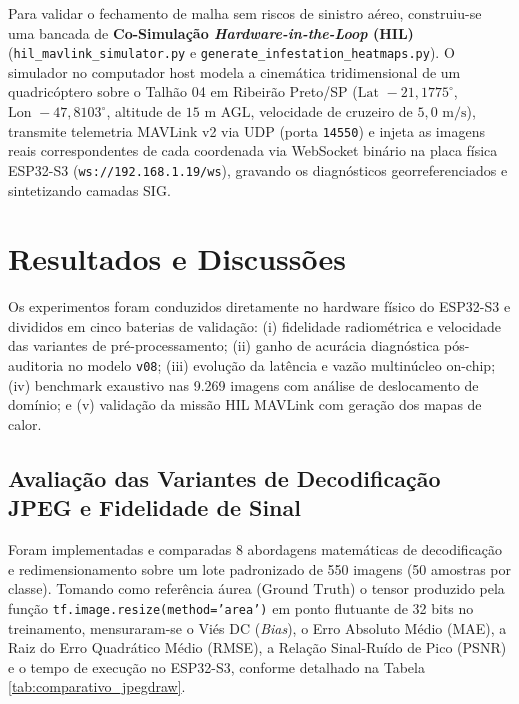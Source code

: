 \documentclass[12pt]{article}
\begin{document}
Para validar o fechamento de malha sem riscos de sinistro aéreo, construiu-se uma bancada de \textbf{Co-Simulação \textit{Hardware-in-the-Loop} (HIL)} (\texttt{hil\_mavlink\_simulator.py} e \texttt{generate\_infestation\_heatmaps.py}). O simulador no computador host modela a cinemática tridimensional de um quadricóptero sobre o Talhão 04 em Ribeirão Preto/SP ($\text{Lat } -21,1775^\circ$, $\text{Lon } -47,8103^\circ$, altitude de $15\text{ m}$ AGL, velocidade de cruzeiro de $5,0\text{ m/s}$), transmite telemetria MAVLink v2 via UDP (porta \texttt{14550}) e injeta as imagens reais correspondentes de cada coordenada via WebSocket binário na placa física ESP32-S3 (\texttt{ws://192.168.1.19/ws}), gravando os diagnósticos georreferenciados e sintetizando camadas SIG.

\section{Resultados e Discussões}

Os experimentos foram conduzidos diretamente no hardware físico do ESP32-S3 e divididos em cinco baterias de validação: (i) fidelidade radiométrica e velocidade das variantes de pré-processamento; (ii) ganho de acurácia diagnóstica pós-auditoria no modelo \texttt{v08}; (iii) evolução da latência e vazão multinúcleo on-chip; (iv) benchmark exaustivo nas 9.269 imagens com análise de deslocamento de domínio; e (v) validação da missão HIL MAVLink com geração dos mapas de calor.

\subsection{Avaliação das Variantes de Decodificação JPEG e Fidelidade de Sinal}

Foram implementadas e comparadas 8 abordagens matemáticas de decodificação e redimensionamento sobre um lote padronizado de 550 imagens (50 amostras por classe). Tomando como referência áurea ($\text{Ground Truth}$) o tensor produzido pela função \texttt{tf.image.resize(method='area')} em ponto flutuante de 32 bits no treinamento, mensuraram-se o Viés DC (\textit{Bias}), o Erro Absoluto Médio (MAE), a Raiz do Erro Quadrático Médio (RMSE), a Relação Sinal-Ruído de Pico (PSNR) e o tempo de execução no ESP32-S3, conforme detalhado na Tabela \ref{tab:comparativo_jpegdraw}.
\end{document}
